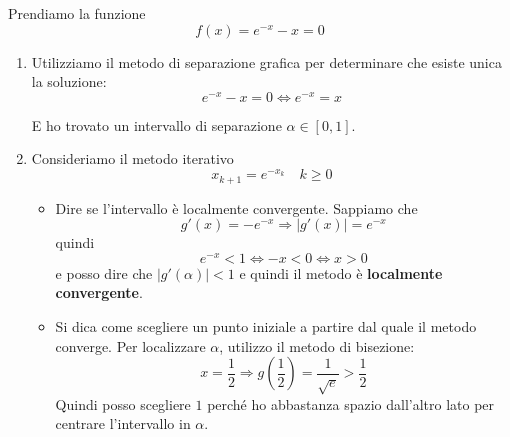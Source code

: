 \begin{example}
	Prendiamo la funzione
	\begin{equation*}
		f(x) = e^{-x} - x = 0
	\end{equation*}
	\begin{enumerate}
		\item Utilizziamo il metodo di separazione grafica per determinare che esiste unica la soluzione:
		\begin{equation*}
			e^{-x} - x = 0 \Leftrightarrow e^{-x} = x
		\end{equation*}
		\begin{center}
		\end{center}
		E ho trovato un intervallo di separazione $\alpha \in [0, 1]$.
		\item Consideriamo il metodo iterativo
		\begin{equation*}
			x_{k+1} = e^{-x_k} \quad k \geq 0
		\end{equation*}
		\begin{itemize}
			\item Dire se l'intervallo è localmente convergente. Sappiamo che 
			\begin{equation*}
				g'(x)=-e^{-x} \Rightarrow \lvert g'(x) \rvert = e^{-x}
			\end{equation*}
			quindi
			\begin{equation*}
				e^{-x} < 1 \Leftrightarrow -x < 0 \Leftrightarrow x >0
			\end{equation*}
			e posso dire che $\lvert g'(\alpha)  \rvert< 1$ e quindi il metodo è \textbf{localmente convergente}.
			\item Si dica come scegliere un punto iniziale a partire dal quale il metodo converge. Per localizzare $\alpha$, utilizzo il metodo di bisezione:
			\begin{equation*}
				x=\frac{1}{2} \Rightarrow g(\frac{1}{2}) = \frac{1}{\sqrt{e}} > \frac{1}{2}
			\end{equation*}
			Quindi posso scegliere $1$ perché ho abbastanza spazio dall'altro lato per centrare l'intervallo in $\alpha$.
		\end{itemize}
	\end{enumerate}
\end{example}
